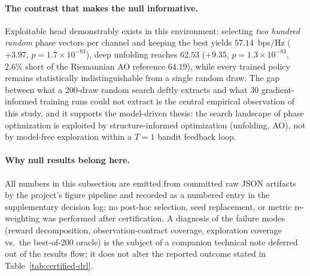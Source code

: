 \paragraph{The contrast that makes the null informative.}
Exploitable head demonstrably exists in this environment: selecting
\emph{two hundred random} phase vectors per channel and keeping the best
yields $57.14$~bps/Hz ($+3.97$, $p=1.7 \times 10^{-83}$), deep
unfolding reaches $62.53$ ($+9.35$, $p=1.3 \times 10^{-83}$,
$2.6\%$ short of the Riemannian AO reference $64.19$), while every trained
policy remains statistically indistinguishable from a single random
draw. The gap between what a 200-draw random search deftly extracts and
what 30 gradient-informed training runs could not extract is the
central empirical observation of this study, and it supports the
model-driven thesis: the search landscape of phase optimization is
exploited by structure-informed optimization (unfolding, AO), not by
model-free exploration within a $T{=}1$ bandit feedback loop.

\paragraph{Why null results belong here.}
All numbers in this subsection are emitted from committed raw JSON
artifacts by the project's figure pipeline and recorded as a numbered
entry in the supplementary decision log; no post-hoc selection, seed replacement, or metric
re-weighting was performed after certification. A diagnosis of the
failure modes (reward decomposition, observation-contract coverage,
exploration coverage vs.\ the best-of-200 oracle) is the subject of a
companion technical note deferred out of the results flow; it does not
alter the reported outcome stated in
Table~\ref{tab:certified-drl}.
